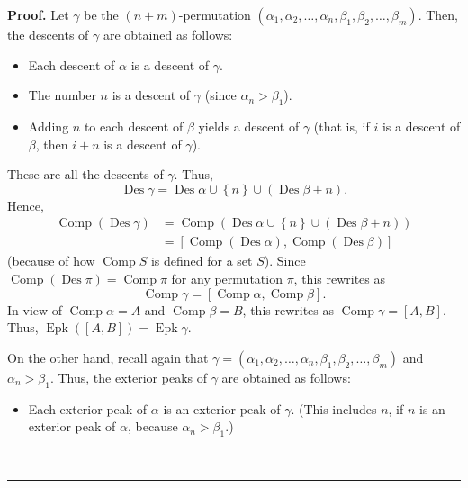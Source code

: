 \documentclass[numbers=enddot,12pt,final,onecolumn,notitlepage]{scrartcl}%
\theoremstyle{definition}
\newenvironment{proof}[1][Proof]{\noindent\textbf{#1.} }{\ \rule{0.5em}{0.5em}}
\newenvironment{verlong}{}{}
\begin{document}
\begin{verlong}
\begin{proof}
Let $\gamma$ be the $\left(  n+m\right)  $-permutation $\left(  \alpha
_{1},\alpha_{2},\ldots,\alpha_{n},\beta_{1},\beta_{2},\ldots,\beta_{m}\right)
$. Then, the descents of $\gamma$ are obtained as follows:

\begin{itemize}
\item Each descent of $\alpha$ is a descent of $\gamma$.

\item The number $n$ is a descent of $\gamma$ (since $\alpha_{n}>\beta_{1}$).

\item Adding $n$ to each descent of $\beta$ yields a descent of $\gamma$ (that
is, if $i$ is a descent of $\beta$, then $i+n$ is a descent of $\gamma$).
\end{itemize}

These are all the descents of $\gamma$. Thus,%
\[
\operatorname{Des}\gamma=\operatorname{Des}\alpha\cup\left\{  n\right\}
\cup\left(  \operatorname{Des}\beta+n\right)  .
\]
Hence,%
\begin{align*}
\operatorname*{Comp}\left(  \operatorname{Des}\gamma\right)   &
=\operatorname*{Comp}\left(  \operatorname{Des}\alpha\cup\left\{  n\right\}
\cup\left(  \operatorname{Des}\beta+n\right)  \right) \\
&  =\left[  \operatorname*{Comp}\left(  \operatorname{Des}\alpha\right)
,\operatorname*{Comp}\left(  \operatorname{Des}\beta\right)  \right]
\end{align*}
(because of how $\operatorname*{Comp}S$ is defined for a set $S$). Since
$\operatorname*{Comp}\left(  \operatorname{Des}\pi\right)
=\operatorname*{Comp}\pi$ for any permutation $\pi$, this rewrites as%
\[
\operatorname*{Comp}\gamma=\left[  \operatorname*{Comp}\alpha
,\operatorname*{Comp}\beta\right]  .
\]
In view of $\operatorname*{Comp}\alpha=A$ and $\operatorname*{Comp}\beta=B$,
this rewrites as $\operatorname*{Comp}\gamma=\left[  A,B\right]  $. Thus,
$\operatorname{Epk}\left(  \left[  A,B\right]  \right)  =\operatorname{Epk}%
\gamma$.

On the other hand, recall again that $\gamma=\left(  \alpha_{1},\alpha
_{2},\ldots,\alpha_{n},\beta_{1},\beta_{2},\ldots,\beta_{m}\right)  $ and
$\alpha_{n}>\beta_{1}$. Thus, the exterior peaks of $\gamma$ are obtained as follows:

\begin{itemize}
\item Each exterior peak of $\alpha$ is an exterior peak of $\gamma$. (This
includes $n$, if $n$ is an exterior peak of $\alpha$, because $\alpha
_{n}>\beta_{1}$.)


\end{itemize}
\end{proof}
\end{verlong}
\end{document}
